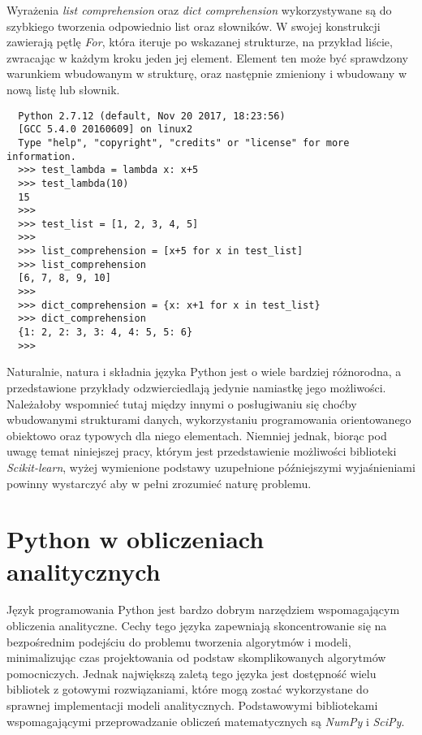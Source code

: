 Wyrażenia \textit{list comprehension} oraz \textit{dict comprehension} wykorzystywane są do szybkiego tworzenia odpowiednio list oraz słowników.
W swojej konstrukcji zawierają pętlę \textit{For}, która iteruje po wskazanej strukturze, na przykład liście, zwracając w każdym kroku jeden jej element.
Element ten może być sprawdzony warunkiem wbudowanym w strukturę, oraz następnie zmieniony i wbudowany w nową listę lub słownik.

\begin{lstlisting}
  Python 2.7.12 (default, Nov 20 2017, 18:23:56) 
  [GCC 5.4.0 20160609] on linux2
  Type "help", "copyright", "credits" or "license" for more information. 
  >>> test_lambda = lambda x: x+5
  >>> test_lambda(10)
  15
  >>> 
  >>> test_list = [1, 2, 3, 4, 5]
  >>> 
  >>> list_comprehension = [x+5 for x in test_list]
  >>> list_comprehension
  [6, 7, 8, 9, 10]
  >>> 
  >>> dict_comprehension = {x: x+1 for x in test_list}
  >>> dict_comprehension
  {1: 2, 2: 3, 3: 4, 4: 5, 5: 6}
  >>> 
\end{lstlisting}

Naturalnie, natura i składnia języka Python jest o wiele bardziej różnorodna, a przedstawione przykłady odzwierciedlają jedynie namiastkę jego możliwości.
Należałoby wspomnieć tutaj między innymi o posługiwaniu się choćby wbudowanymi strukturami danych, wykorzystaniu programowania orientowanego obiektowo oraz typowych dla niego elementach.
Niemniej jednak, biorąc pod uwagę temat niniejszej pracy, którym jest przedstawienie możliwości biblioteki \textit{Scikit-learn}, wyżej wymienione podstawy uzupełnione późniejszymi wyjaśnieniami powinny wystarczyć aby w pełni zrozumieć naturę problemu.




\section{Python w obliczeniach analitycznych}
Język programowania Python jest bardzo dobrym narzędziem wspomagającym obliczenia analityczne.
Cechy tego języka zapewniają skoncentrowanie się na bezpośrednim podejściu do problemu tworzenia algorytmów i modeli, minimalizując czas projektowania od podstaw skomplikowanych algorytmów pomocniczych.
Jednak największą zaletą tego języka jest dostępność wielu bibliotek z gotowymi rozwiązaniami, które mogą zostać wykorzystane do sprawnej implementacji modeli analitycznych.
Podstawowymi bibliotekami wspomagającymi przeprowadzanie obliczeń matematycznych są \textit{NumPy} i \textit{SciPy}.\\

